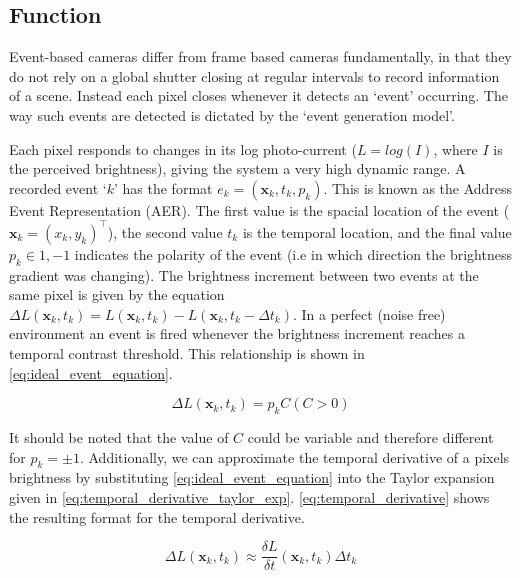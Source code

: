 \subsection{Function} \label{ssec:event_camera_function}
Event-based cameras differ from frame based cameras fundamentally, in that they do not rely on a global shutter closing at regular intervals to record information of a scene. Instead each pixel closes whenever it detects an `event' occurring. The way such events are detected is dictated by the `event generation model'\cite{EventBasedVisionASurvery}.

Each pixel responds to changes in its log photo-current ($ L = log(I) $, where $I$ is the perceived brightness), giving the system a very high dynamic range. A recorded event `$ k $' has the format $ e_k = (\boldsymbol{\mathbf{x}}_k, t_k, p_k ) $. This is known as the Address Event Representation (AER). The first value is the spacial location of the event ($ \boldsymbol{\mathbf{x}}_k = (x_k, y_k)^\top $), the second value $ t_k $ is the temporal location, and the final value $ p_k \in {1, -1} $ indicates the polarity of the event (i.e in which direction the brightness gradient was changing). The brightness increment between two events at the same pixel is given by the equation $ \Delta L(\boldsymbol{\mathbf{x}}_k, t_k) = L(\boldsymbol{\mathbf{x}}_k, t_k) - L(\boldsymbol{\mathbf{x}}_k, t_k - \Delta t_k) $. In a perfect (noise free) environment an event is fired whenever the brightness increment reaches a temporal contrast threshold. This relationship is shown in \autoref{eq:ideal_event_equation}.

\begin{equation}
      \Delta L(\boldsymbol{\mathbf{x}}_k, t_k) = p_k C ( C > 0 )
      \label{eq:ideal_event_equation}
\end{equation}

It should be noted that the value of $ C $ could be variable and therefore different for $ p_k = \pm 1 $. Additionally, we can approximate the temporal derivative of a pixels brightness by substituting \autoref{eq:ideal_event_equation} into the Taylor expansion given in \autoref{eq:temporal_derivative_taylor_exp}. \autoref{eq:temporal_derivative} shows the resulting format for the temporal derivative.

\begin{equation}
      \Delta L(\boldsymbol{\mathbf{x}}_k, t_k) \approx \frac{\delta L}{\delta t}(\boldsymbol{\mathbf{x}}_k, t_k)\Delta t_k
      \label{eq:temporal_derivative_taylor_exp}
\end{equation}

